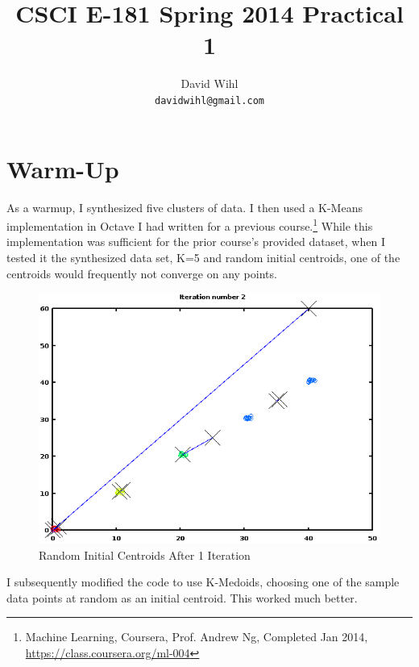 \documentclass[11pt, oneside]{article}   	%
\title{CSCI E-181 Spring 2014 Practical 1}
\author{David Wihl\\
     \texttt{davidwihl@gmail.com}}
\begin{document}
\maketitle
\section*{Warm-Up}


\par As a warmup, I synthesized five clusters of data.  I then used a K-Means implementation in Octave I had written for a previous course.\footnote{Machine Learning, Coursera, Prof. Andrew Ng, Completed Jan 2014, \url{https://class.coursera.org/ml-004}} While this implementation was sufficient for the prior course's provided dataset, when I tested it the synthesized data set, K=5 and random initial centroids, one of the centroids would frequently not converge on any points.

\begin{figure}[h!] %
\centering
\includegraphics[scale=0.6]{randominitialClusters}
\caption{Random Initial Centroids After 1 Iteration}
\end{figure}

I subsequently modified the code to use K-Medoids, choosing one of the sample data points at random as an initial centroid. This worked much better.
\end{document}
